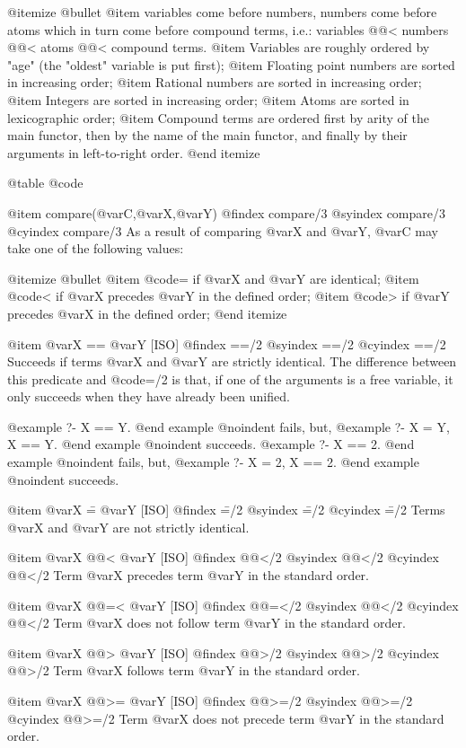 {{{{@itemize @bullet
@item
variables come before numbers, numbers come before atoms which in turn
come before compound terms, i.e.: variables @@< numbers @@< atoms @@<
compound terms.
@item
Variables are roughly ordered by "age" (the "oldest" variable is put
first);
@item
Floating point numbers are sorted in increasing order;
@item
Rational numbers are sorted in increasing order;
@item
Integers are sorted in increasing order;
@item
Atoms are sorted in lexicographic order;
@item
Compound terms are ordered first by arity of the main functor, then by
the name of the main functor, and finally by their arguments in
left-to-right order.
@end itemize

@table @code

@item compare(@var{C},@var{X},@var{Y})
@findex compare/3
@syindex compare/3
@cyindex compare/3
As a result of comparing @var{X} and @var{Y}, @var{C} may take one of
the following values:

@itemize @bullet
@item
@code{=} if @var{X} and @var{Y} are identical;
@item
@code{<} if @var{X} precedes @var{Y} in the defined order;
@item
@code{>} if @var{Y} precedes @var{X} in the defined order;
@end itemize

@item @var{X} == @var{Y} [ISO]
@findex ==/2
@syindex ==/2
@cyindex ==/2
Succeeds if terms @var{X} and @var{Y} are strictly identical. The
difference between this predicate and @code{=/2} is that, if one of the
arguments is a free variable, it only succeeds when they have already
been unified.

@example
?- X == Y.
@end example
@noindent
fails, but,
@example
?- X = Y, X == Y.
@end example
@noindent
succeeds.
@example
?- X == 2.
@end example
@noindent
fails, but,
@example
?- X = 2, X == 2.
@end example
@noindent
succeeds.


@item @var{X} \== @var{Y} [ISO]
@findex \==/2
@syindex \==/2
@cyindex \==/2
Terms @var{X} and @var{Y} are not strictly identical.

@item @var{X} @@< @var{Y} [ISO]
@findex @@</2
@syindex @@</2
@cyindex @@</2
Term @var{X} precedes term @var{Y} in the standard order.

@item @var{X} @@=< @var{Y} [ISO]
@findex @@=</2
@syindex @@</2
@cyindex @@</2
Term @var{X} does not follow term @var{Y} in the standard order.

@item @var{X} @@> @var{Y} [ISO]
@findex @@>/2
@syindex @@>/2
@cyindex @@>/2
Term @var{X} follows term @var{Y} in the standard order.

@item @var{X} @@>= @var{Y} [ISO]
@findex @@>=/2
@syindex @@>=/2
@cyindex @@>=/2
Term @var{X} does not precede term @var{Y} in the standard order.

}}}}
